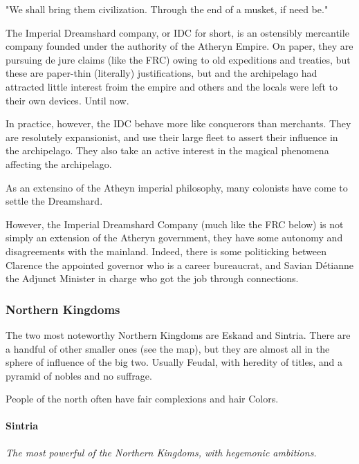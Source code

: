 \begin{rpg-quotebox}
    "We shall bring them civilization. Through the end of a musket, if need be."
    \end{rpg-quotebox}
    

The Imperial Dreamshard company, or IDC for short, is an ostensibly mercantile company founded under the authority of the Atheryn Empire. On paper, they are pursuing de jure claims (like the FRC) owing to old expeditions and treaties, but these are paper-thin (literally) justifications, but and the archipelago had attracted little interest froim the empire and others and the locals were left to their own devices. Until now.




In practice, however, the IDC behave more like conquerors than merchants. They are resolutely expansionist, and use their large fleet to assert their influence in the archipelago. They also take an active interest in the magical phenomena affecting the archipelago.

As an extensino of the Atheyn imperial philosophy, many colonists have come to settle the Dreamshard.

However, the Imperial Dreamshard Company (much like the FRC below) is not simply an extension of the Atheryn government, they have some autonomy and disagreements with the mainland. Indeed, there is some politicking between Clarence the appointed governor who is a career bureaucrat, and Savian Détianne the Adjunct Minister in charge who got the job through connections.



\subsubsection{Northern Kingdoms}

The two most noteworthy Northern Kingdoms are Eskand and Sintria. There are a handful of other smaller ones (see the map), but they are almost all in the sphere of influence of the big two. Usually Feudal, with heredity of titles, and a pyramid of nobles and no suffrage.

People of the north often have fair complexions and hair Colors.



\paragraph{Sintria}

\textit{The most powerful of the Northern Kingdoms, with hegemonic ambitions.}

